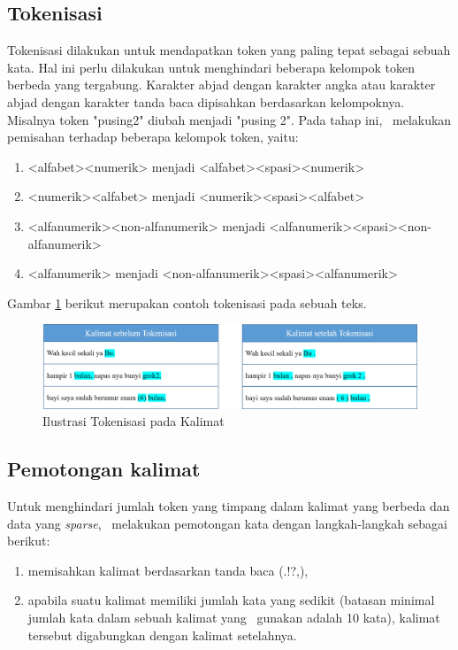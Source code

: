 \subsection{Tokenisasi}
Tokenisasi dilakukan untuk mendapatkan token yang paling tepat sebagai sebuah kata. Hal ini perlu dilakukan untuk menghindari beberapa kelompok token berbeda yang tergabung. Karakter abjad dengan karakter angka atau karakter abjad dengan karakter tanda baca dipisahkan berdasarkan kelompoknya. Misalnya token "pusing2" diubah menjadi "pusing 2". Pada tahap ini, \saya~melakukan pemisahan terhadap beberapa kelompok token, yaitu:
\begin{enumerate}
	\item <alfabet><numerik> menjadi <alfabet><spasi><numerik>
	\item <numerik><alfabet> menjadi <numerik><spasi><alfabet>
	\item <alfanumerik><non-alfanumerik> menjadi <alfanumerik><spasi><non-alfanumerik>
	\item <non-alfanumerik><alfanumerik> menjadi <non-alfanumerik><spasi><alfanumerik>
\end{enumerate}

Gambar \ref{fig:tokenisasi} berikut merupakan contoh tokenisasi pada sebuah teks.
\begin{figure}
	\centering
	\includegraphics[width=\linewidth]{images/tokenisasi}
	\caption{Ilustrasi Tokenisasi pada Kalimat}
	\label{fig:tokenisasi}
\end{figure}

	
\subsection{Pemotongan kalimat}
Untuk menghindari jumlah token yang timpang dalam kalimat yang berbeda dan data yang \textit{sparse}, \saya~melakukan pemotongan kata dengan langkah-langkah sebagai berikut:
\begin{enumerate}
	\item memisahkan kalimat berdasarkan tanda baca (.!?,),
	\item apabila suatu kalimat memiliki jumlah kata yang sedikit (batasan minimal jumlah kata dalam sebuah kalimat yang \saya~gunakan adalah 10 kata), kalimat tersebut digabungkan dengan kalimat setelahnya.
\end{enumerate}

